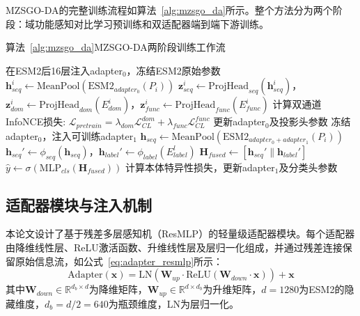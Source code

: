 MZSGO-DA的完整训练流程如算法~\ref{alg:mzsgo_da}所示。整个方法分为两个阶段：域功能感知对比学习预训练和双适配器端到端下游训练。
\begin{center}
算法~\ref{alg:mzsgo_da}\quad MZSGO-DA两阶段训练工作流
\end{center}
\vspace{-0.5em}
\begin{algorithm}[H]
\caption{MZSGO-DA两阶段训练工作流}
\label{alg:mzsgo_da}
\SetAlgoLined
{}
在ESM2后16层注入adapter$_0$，冻结ESM2原始参数\;
$\mathbf{h}_{seq}^i \leftarrow \text{MeanPool}(\text{ESM2}_{adapter_0}(P_i))$\;
$\mathbf{z}_{seq}^i \leftarrow \text{ProjHead}_{seq}(\mathbf{h}_{seq}^i)$，$\mathbf{z}_{dom}^i \leftarrow \text{ProjHead}_{dom}(E_{dom}^i)$，$\mathbf{z}_{func}^i \leftarrow \text{ProjHead}_{func}(E_{func}^i)$\;
计算双通道InfoNCE损失: $\mathcal{L}_{pretrain} = \lambda_{dom}\mathcal{L}_{CL}^{dom} + \lambda_{func}\mathcal{L}_{CL}^{func}$\;
更新adapter$_0$及投影头参数\;
冻结adapter$_0$，注入可训练adapter$_1$\;
$\mathbf{h}_{seq} \leftarrow \text{MeanPool}(\text{ESM2}_{adapter_0+adapter_1}(P_i))$\;
$\mathbf{h}_{seq}' \leftarrow \phi_{seq}(\mathbf{h}_{seq})$，$\mathbf{h}_{label}' \leftarrow \phi_{label}(E_{label}^l)$\;
$\mathbf{H}_{fused} \leftarrow [\mathbf{h}_{seq}' \parallel \mathbf{h}_{label}']$\;
$\hat{y} \leftarrow \sigma(\text{MLP}_{cls}(\mathbf{H}_{fused}))$\;
计算本体特异性损失，更新adapter$_1$及分类头参数\;
\end{algorithm}

\subsection{适配器模块与注入机制}

本论文设计了基于残差多层感知机（ResMLP）的轻量级适配器模块。每个适配器由降维线性层、ReLU激活函数、升维线性层及层归一化组成，并通过残差连接保留原始信息流，如公式~\eqref{eq:adapter_resmlp}所示：
\begin{equation}
\label{eq:adapter_resmlp}
    \text{Adapter}(\mathbf{x}) = \text{LN}(\mathbf{W}_{up} \cdot \text{ReLU}(\mathbf{W}_{down} \cdot \mathbf{x})) + \mathbf{x}
\end{equation}
其中$\mathbf{W}_{down} \in \mathbb{R}^{d_b \times d}$为降维矩阵，$\mathbf{W}_{up} \in \mathbb{R}^{d \times d_b}$为升维矩阵，$d=1280$为ESM2的隐藏维度，$d_b=d/2=640$为瓶颈维度，LN为层归一化。

